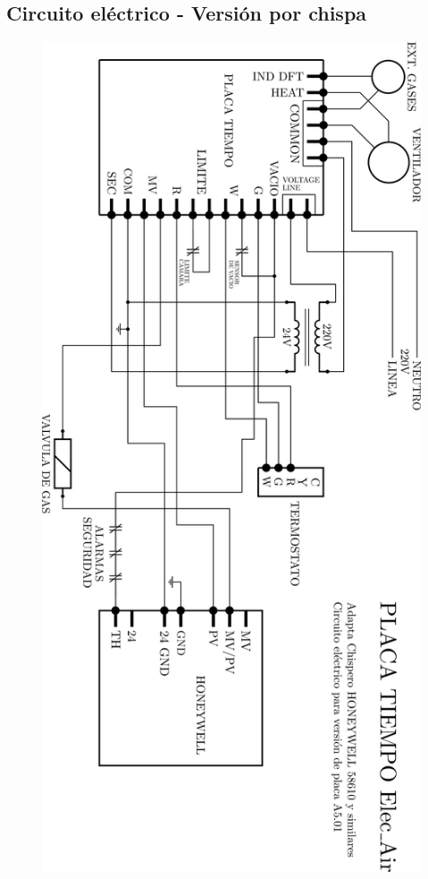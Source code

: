 \documentclass{article}
\begin{document}
\newpage

\subsection*{Circuito eléctrico - Versión por chispa}

\begin{figure}[H]
\centering
\includegraphics[width=0.65\linewidth]{images/PlacaTiempo_EsquematicoV501.png}
\end{figure}

\newpage
\end{document}
